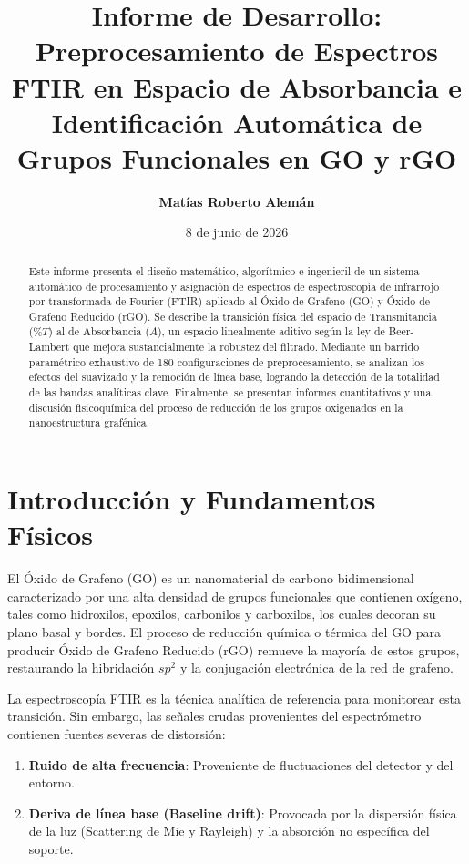 \documentclass[a4paper,11pt]{article}
\title{\textbf{Informe de Desarrollo: \\Preprocesamiento de Espectros FTIR en Espacio de Absorbancia e Identificación Automática de Grupos Funcionales en GO y rGO}}
\author{\textbf{Matías Roberto Alemán}}
\date{8 de junio de 2026}
\begin{document}
\maketitle

\begin{abstract}
Este informe presenta el diseño matemático, algorítmico e ingenieril de un sistema automático de procesamiento y asignación de espectros de espectroscopía de infrarrojo por transformada de Fourier (FTIR) aplicado al Óxido de Grafeno (GO) y Óxido de Grafeno Reducido (rGO). Se describe la transición física del espacio de Transmitancia ($\%T$) al de Absorbancia ($A$), un espacio linealmente aditivo según la ley de Beer-Lambert que mejora sustancialmente la robustez del filtrado. Mediante un barrido paramétrico exhaustivo de 180 configuraciones de preprocesamiento, se analizan los efectos del suavizado y la remoción de línea base, logrando la detección de la totalidad de las bandas analíticas clave. Finalmente, se presentan informes cuantitativos y una discusión fisicoquímica del proceso de reducción de los grupos oxigenados en la nanoestructura grafénica.
\end{abstract}

\tableofcontents

\newpage

\section{Introducción y Fundamentos Físicos}
El Óxido de Grafeno (GO) es un nanomaterial de carbono bidimensional caracterizado por una alta densidad de grupos funcionales que contienen oxígeno, tales como hidroxilos, epoxilos, carbonilos y carboxilos, los cuales decoran su plano basal y bordes. El proceso de reducción química o térmica del GO para producir Óxido de Grafeno Reducido (rGO) remueve la mayoría de estos grupos, restaurando la hibridación $sp^2$ y la conjugación electrónica de la red de grafeno.

La espectroscopía FTIR es la técnica analítica de referencia para monitorear esta transición. Sin embargo, las señales crudas provenientes del espectrómetro contienen fuentes severas de distorsión:
\begin{enumerate}
    \item \textbf{Ruido de alta frecuencia}: Proveniente de fluctuaciones del detector y del entorno.
    \item \textbf{Deriva de línea base (Baseline drift)}: Provocada por la dispersión física de la luz (Scattering de Mie y Rayleigh) y la absorción no específica del soporte.
\end{enumerate}
\end{document}
